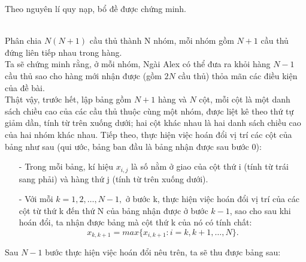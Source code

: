 \begin{bt}
{\begin{bode}
			Theo nguyên lí quy nạp, bổ đề được chứng minh.
		\end{bode}
		\\ 
		Phân chia $N(N+1)$ cầu thủ thành N nhóm, mỗi nhóm gồm $N+1$ cầu thủ đứng liên tiếp nhau trong hàng.\\
		Ta sẽ chứng minh rằng, ở mỗi nhóm, Ngài Alex có thể đưa ra khỏi hàng $N-1$ cầu thủ sao cho hàng mới nhận được (gồm $2N$ cầu thủ) thỏa mãn các điều kiện của đề bài.\\
		Thật vậy, trước hết, lập bảng gồm $N+1$ hàng và $N$ cột, mỗi cột là một danh sách chiều cao của các cầu thủ thuộc cùng một nhóm, được liệt kê theo thứ tự giảm dần, tính từ trên xuống dưới; hai cột khác nhau là hai danh sách chiều cao của hai nhóm khác nhau. Tiếp theo, thực hiện việc hoán đổi vị trí các cột của bảng như sau (qui ước, bảng ban đầu là bảng nhận được sau bước 0):
		\begin{enumerate}
			\item[-] Trong mỗi bảng, kí hiệu $x_{i,j}$ là số nằm ở giao của cột thứ i (tính từ trái sang phải) và hàng thứ j (tính từ trên xuống dưới).
			\item[-] Với mỗi $k = 1,2,\dots,N-1,$ ở bước k, thực hiện việc hoán đổi vị trí của các cột từ thứ k đến thứ N của bảng nhận được ở bước $k-1$, sao cho sau khi hoán đổi, ta nhận được bảng mà cột thứ k của nó có tính chất:
			$$ x_{k,k+1}=max\{x_{i,k+1}: i=k, k+1, \dots, N\}.$$
		\end{enumerate}
		Sau $N-1$ bước thực hiện việc hoán đổi nêu trên, ta sẽ thu được bảng sau:
		
}
\end{bt}
